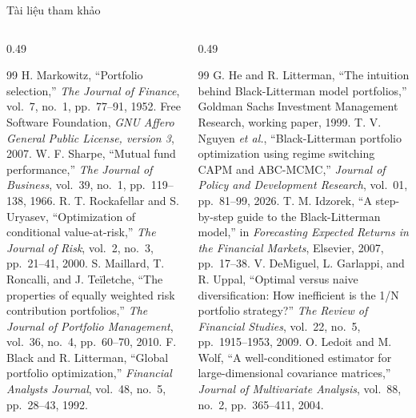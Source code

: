 \documentclass[aspectratio=169,10pt]{beamer}
\begin{document}
\begin{frame}[t]{Tài liệu tham khảo}
  \fontsize{8}{9.6}\selectfont\vspace{-6pt}
  \begin{columns}[T]
    \begin{column}{0.49\textwidth}
      \begin{thebibliography}{99}
       H. Markowitz, ``Portfolio selection,'' \emph{The Journal of Finance}, vol.~7, no.~1, pp.~77--91, 1952.
       Free Software Foundation, \emph{GNU Affero General Public License, version 3}, 2007.
       W. F. Sharpe, ``Mutual fund performance,'' \emph{The Journal of Business}, vol.~39, no.~1, pp.~119--138, 1966.
       R. T. Rockafellar and S. Uryasev, ``Optimization of conditional value-at-risk,'' \emph{The Journal of Risk}, vol.~2, no.~3, pp.~21--41, 2000.
       S. Maillard, T. Roncalli, and J. Teïletche, ``The properties of equally weighted risk contribution portfolios,'' \emph{The Journal of Portfolio Management}, vol.~36, no.~4, pp.~60--70, 2010.
       F. Black and R. Litterman, ``Global portfolio optimization,'' \emph{Financial Analysts Journal}, vol.~48, no.~5, pp.~28--43, 1992.
      \end{thebibliography}
    \end{column}
    \begin{column}{0.49\textwidth}
      \begin{thebibliography}{99}
      \setcounter{enumiv}{6}
       G. He and R. Litterman, ``The intuition behind Black-Litterman model portfolios,'' Goldman Sachs Investment Management Research, working paper, 1999.
       T. V. Nguyen \emph{et al.}, ``Black-Litterman portfolio optimization using regime switching CAPM and ABC-MCMC,'' \emph{Journal of Policy and Development Research}, vol.~01, pp.~81--99, 2026.
       T. M. Idzorek, ``A step-by-step guide to the Black-Litterman model,'' in \emph{Forecasting Expected Returns in the Financial Markets}, Elsevier, 2007, pp.~17--38.
       V. DeMiguel, L. Garlappi, and R. Uppal, ``Optimal versus naive diversification: How inefficient is the 1/N portfolio strategy?'' \emph{The Review of Financial Studies}, vol.~22, no.~5, pp.~1915--1953, 2009.
       O. Ledoit and M. Wolf, ``A well-conditioned estimator for large-dimensional covariance matrices,'' \emph{Journal of Multivariate Analysis}, vol.~88, no.~2, pp.~365--411, 2004.
      \end{thebibliography}
    \end{column}
  \end{columns}
\end{frame}
\end{document}
